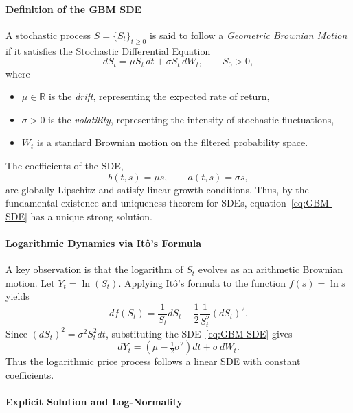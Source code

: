 \paragraph{Definition of the GBM SDE}

\begin{definition}
A stochastic process $S = \{S_t\}_{t \ge 0}$ is said to follow a \emph{Geometric Brownian Motion} if it satisfies the Stochastic Differential Equation
\begin{equation}\label{eq:GBM-SDE}
dS_t = \mu S_t\, dt + \sigma S_t\, dW_t, \qquad S_0 > 0,
\end{equation}
where
\begin{itemize}
    \item $\mu \in \mathbb{R}$ is the \emph{drift}, representing the expected rate of return,
    \item $\sigma > 0$ is the \emph{volatility}, representing the intensity of stochastic fluctuations,
    \item $W_t$ is a standard Brownian motion on the filtered probability space.
\end{itemize}
\end{definition}

The coefficients of the SDE,
\[
b(t,s) = \mu s, \qquad a(t,s) = \sigma s,
\]
are globally Lipschitz and satisfy linear growth conditions. Thus, by the fundamental existence and uniqueness theorem for SDEs, equation~\eqref{eq:GBM-SDE} has a unique strong solution.
\paragraph{Logarithmic Dynamics via Itô's Formula}

A key observation is that the logarithm of $S_t$ evolves as an arithmetic Brownian motion.  
Let $Y_t = \ln(S_t)$. Applying Itô’s formula to the function $f(s) = \ln s$ yields
\[
df(S_t)
= \frac{1}{S_t} dS_t 
- \frac12 \frac{1}{S_t^2} (dS_t)^2.
\]
Since $(dS_t)^2 = \sigma^2 S_t^2 dt$, substituting the SDE~\eqref{eq:GBM-SDE} gives
\begin{equation}\label{eq:logS-dynamics}
dY_t = \left( \mu - \tfrac{1}{2}\sigma^2 \right) dt + \sigma\, dW_t.
\end{equation}
Thus the logarithmic price process follows a linear SDE with constant coefficients.
\paragraph{Explicit Solution and Log-Normality}

